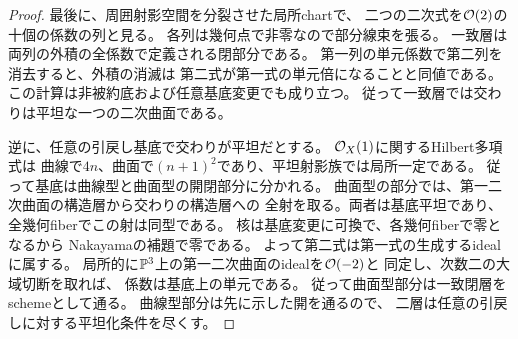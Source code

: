 \begin{proof}
最後に、周囲射影空間を分裂させた局所chartで、
二つの二次式を$\mathcal O(2)$の十個の係数の列と見る。
各列は幾何点で非零なので部分線束を張る。
一致層は両列の外積の全係数で定義される閉部分である。
第一列の単元係数で第二列を消去すると、外積の消滅は
第二式が第一式の単元倍になることと同値である。
この計算は非被約底および任意基底変更でも成り立つ。
従って一致層では交わりは平坦な一つの二次曲面である。

逆に、任意の引戻し基底で交わりが平坦だとする。
$\mathcal O_X(1)$に関するHilbert多項式は
曲線で$4n$、曲面で$(n+1)^2$であり、平坦射影族では局所一定である。
従って基底は曲線型と曲面型の開閉部分に分かれる。
曲面型の部分では、第一二次曲面の構造層から交わりの構造層への
全射を取る。両者は基底平坦であり、
全幾何fiberでこの射は同型である。
核は基底変更に可換で、各幾何fiberで零となるから
Nakayamaの補題で零である。
よって第二式は第一式の生成するidealに属する。
局所的に$\mathbb P^3$上の第一二次曲面のidealを$\mathcal O(-2)$と
同定し、次数二の大域切断を取れば、
係数は基底上の単元である。
従って曲面型部分は一致閉層をschemeとして通る。
曲線型部分は先に示した開を通るので、
二層は任意の引戻しに対する平坦化条件を尽くす。
\end{proof}

